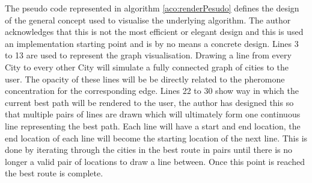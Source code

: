 The pseudo code represented in algorithm \ref{aco:renderPesudo} defines the design of the general concept used to visualise the underlying algorithm. The author acknowledges that this is not the most efficient or elegant design and this is used an implementation starting point and is by no means a concrete design. Lines 3 to 13 are used to represent the graph visualisation. Drawing a line from every City to every other City will simulate a fully connected graph of cities to the user. The opacity of these lines will be be directly related to the pheromone concentration for the corresponding edge. Lines 22 to 30 show way in which the current best path will be rendered to the user, the author has designed this so that multiple pairs of lines are drawn which will ultimately form one continuous line representing the best path. Each line will have a start and end location, the end location of each line will become the starting location of the next line. This is done by iterating through the cities in the best route in pairs until there is no longer a valid pair of locations to draw a line between. Once this point is reached the best route is complete.